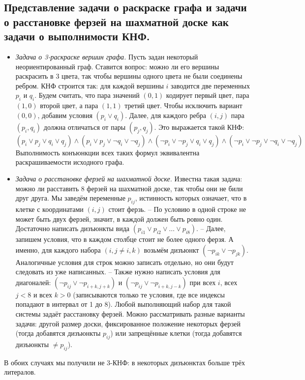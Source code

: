 \subsection{Представление задачи о раскраске графа и задачи о расстановке ферзей на шахматной доске как задачи о выполнимости КНФ.}
\begin{itemize}
    \item \textit{Задача о 3-раскраске вершин графа.} Пусть задан некоторый неориентированный граф. Ставится вопрос: можно ли его вершины раскрасить в 3 цвета, так чтобы
    вершины одного цвета не были соединены ребром. КНФ строится так: для каждой вершины $i$ заводится две переменных $p_i$ и $q_i$. Будем считать, что пара значений
    $(0, 1)$ кодирует первый цвет, пара $(1, 0)$ второй цвет, а пара $(1, 1)$ третий цвет. Чтобы исключить вариант $(0, 0)$, добавим условия $(p_i \lor q_i)$. Далее, для каждого
    ребра $(i, j)$ пара $(p_i, q_i)$ должна отличаться от пары $(p_j, q_j)$. Это выражается такой КНФ: $$(p_i\lor p_j \lor q_i \lor q_j )\land(p_i\lor p_j \lor \neg q_i \lor \neg q_j )\land (\neg p_i\lor \neg p_j\lor q_i\lor q_j )\land(\neg p_i\lor \neg p_j \lor \neg q_i \lor\neg q_j )$$
    Выполнимость конъюнкции всех таких формул эквивалентна раскрашиваемости исходного графа.
    
    \item \textit{Задача о расстановке ферзей на шахматной доске.} Известна такая задача: можно ли расставить $8$ ферзей на шахматной доске, так чтобы они не били друг друга. Мы заведём переменные $p_{ij}$, истинность которых означает, что в клетке с координатами $(i, j)$ стоит ферзь. 
    \newline -- По условию в одной строке не может быть двух ферзей, значит, в каждой должен быть ровно один. Достаточно написать дизъюнкты вида $(p_{i1} \lor p_{i2} \lor \ldots\lor p_{i8})$. \newline -- Далее, запишем условия, что в каждом столбце стоит не более одного ферзя. А именно, для каждого набора $(i, j \neq i, k)$ возьмём дизъюнкт $(\neg p_{ik} \lor \neg p_{jk})$. Аналогичные условия для строк можно записать отдельно, но они будут следовать из уже написанных. \newline -- Также нужно написать условия для диагоналей: $(\neg p_{ij} \lor \neg p_{i+k,j+k})$ и $(\neg p_{ij} \lor\neg p_{i+k,j-k})$ при всех $i$, всех $j < 8$ и всех $k> 0$ (записываются только те условия, где все индексы попадают в интервал от 1 до 8). \newline Любой выполняющий набор для такой системы задаёт расстановку ферзей. Можно рассматривать разные варианты задачи: другой размер доски, фиксированное положение некоторых ферзей (тогда добавятся дизъюнкты $p_{ij}$) или запрещённые клетки (тогда добавятся дизъюнкты $\neq p_{ij}$).
\end{itemize}
В обоих случаях мы получили не 3-КНФ: в некоторых дизъюнктах больше трёх литералов.

